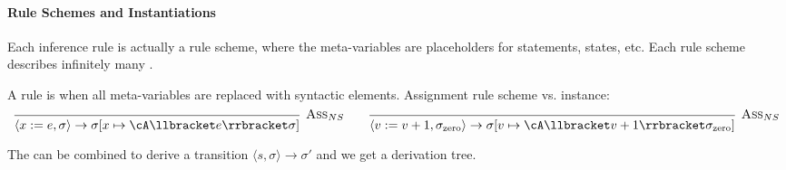 \paragraph{Rule Schemes and Instantiations}
Each inference rule is actually a rule scheme, where the meta-variables are placeholders for statements, states, etc.
Each rule scheme describes infinitely many .

A rule is  when all meta-variables are replaced with syntactic elements.
Assignment rule scheme vs. instance:
\[
    \begin{prooftree}
        \infer0[\textsc{Ass}$_{NS}$]{\langle x := e, \sigma \rangle \rightarrow \sigma[x \mapsto \cA\llbracket e \rrbracket \sigma]}
    \end{prooftree}
    \qquad
    \begin{prooftree}
        \infer0[\textsc{Ass}$_{NS}$]{\langle v := v + 1, \sigma_\text{zero} \rangle \rightarrow \sigma[v \mapsto \cA\llbracket v + 1 \rrbracket \sigma_\text{zero}]}
    \end{prooftree}
\]

The  can be combined to derive a transition $\langle s, \sigma \rangle \rightarrow \sigma'$ and we get a derivation tree.
